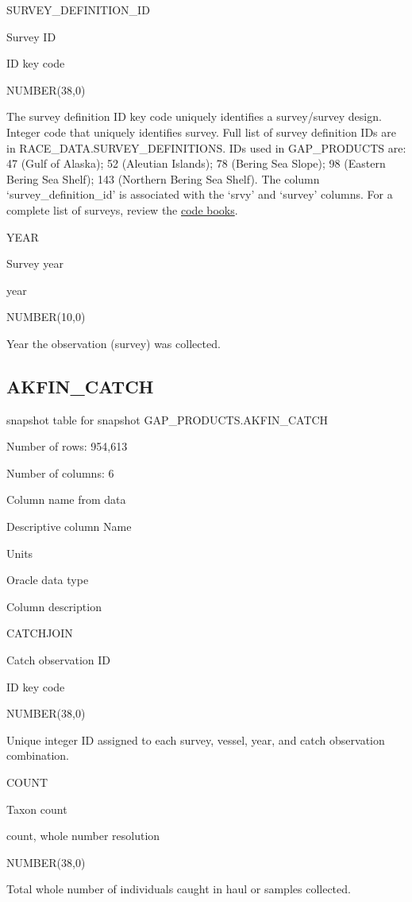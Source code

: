 \documentclass[
  letterpaper,
  oneside,
  open=any]{scrbook}
\begin{document}
SURVEY\_DEFINITION\_ID

Survey ID

ID key code

NUMBER(38,0)

The survey definition ID key code uniquely identifies a survey/survey
design. Integer code that uniquely identifies survey. Full list of
survey definition IDs are in RACE\_DATA.SURVEY\_DEFINITIONS. IDs used in
GAP\_PRODUCTS are: 47 (Gulf of Alaska); 52 (Aleutian Islands); 78
(Bering Sea Slope); 98 (Eastern Bering Sea Shelf); 143 (Northern Bering
Sea Shelf). The column `survey\_definition\_id' is associated with the
`srvy' and `survey' columns. For a complete list of surveys, review the
\href{https://www.fisheries.noaa.gov/resource/document/groundfish-survey-species-code-manual-and-data-codes-manual}{code
books}.

YEAR

Survey year

year

NUMBER(10,0)

Year the observation (survey) was collected.

\hypertarget{akfin_catch}{%
\subsection{AKFIN\_CATCH}\label{akfin_catch}}

snapshot table for snapshot GAP\_PRODUCTS.AKFIN\_CATCH

Number of rows: 954,613

Number of columns: 6

Column name from data

Descriptive column Name

Units

Oracle data type

Column description

CATCHJOIN

Catch observation ID

ID key code

NUMBER(38,0)

Unique integer ID assigned to each survey, vessel, year, and catch
observation combination.

COUNT

Taxon count

count, whole number resolution

NUMBER(38,0)

Total whole number of individuals caught in haul or samples collected.
\end{document}

